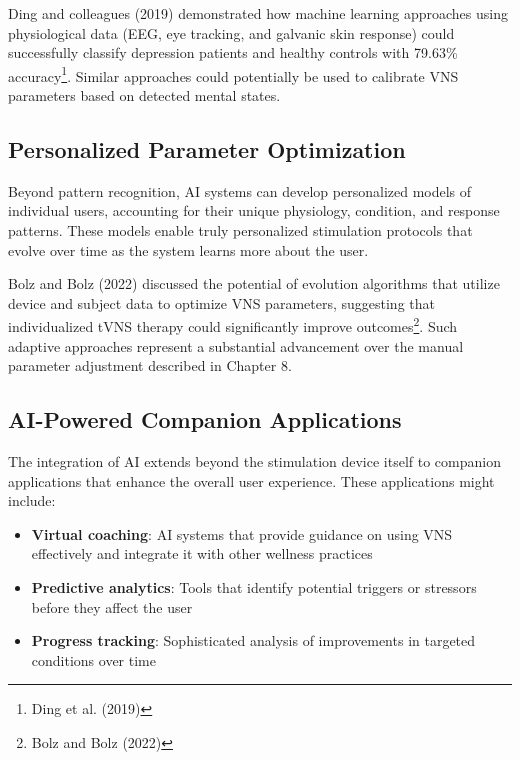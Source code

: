 \documentclass[
  Letterpaper,
]{scrbook}
\providecommand{\tightlist}{%
  \setlength{\itemsep}{0pt}\setlength{\parskip}{0pt}}\usepackage{longtable,booktabs,array}
\begin{document}
Ding and colleagues (2019) demonstrated how machine learning approaches
using physiological data (EEG, eye tracking, and galvanic skin response)
could successfully classify depression patients and healthy controls
with 79.63\% accuracy\footnote{Ding et al. (2019)}. Similar approaches
could potentially be used to calibrate VNS parameters based on detected
mental states.

\subsection{Personalized Parameter
Optimization}\label{personalized-parameter-optimization}

Beyond pattern recognition, AI systems can develop personalized models
of individual users, accounting for their unique physiology, condition,
and response patterns. These models enable truly personalized
stimulation protocols that evolve over time as the system learns more
about the user.

Bolz and Bolz (2022) discussed the potential of evolution algorithms
that utilize device and subject data to optimize VNS parameters,
suggesting that individualized tVNS therapy could significantly improve
outcomes\footnote{Bolz and Bolz (2022)}. Such adaptive approaches
represent a substantial advancement over the manual parameter adjustment
described in Chapter 8.

\subsection{AI-Powered Companion
Applications}\label{ai-powered-companion-applications}

The integration of AI extends beyond the stimulation device itself to
companion applications that enhance the overall user experience. These
applications might include:

\begin{itemize}
\tightlist
\item
  \textbf{Virtual coaching}: AI systems that provide guidance on using
  VNS effectively and integrate it with other wellness practices
\item
  \textbf{Predictive analytics}: Tools that identify potential triggers
  or stressors before they affect the user
\item
  \textbf{Progress tracking}: Sophisticated analysis of improvements in
  targeted conditions over time
\end{itemize}
\end{document}
